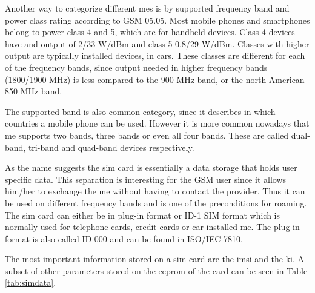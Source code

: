 Another way to categorize different \gls{me}s is by supported frequency band and power class rating according to GSM  05.05\cite{GSM0505}.
Most mobile phones and smartphones belong to power class 4 and 5, which are for handheld devices.
Class 4 devices have and output of 2/33 W/dBm and class 5 0.8/29 W/dBm.
Classes with higher output are typically installed devices, \eg in cars.
These classes are different for each of the frequency bands, since output needed in higher frequency bands (1800/1900 MHz) is less compared to the 900 MHz band, or the north American 850 MHz band.

The supported band is also common category, since it describes in which countries a mobile phone can be used.
However it is more common nowadays that \gls{me} supports two bands, three bands or even all four bands.
These are called dual-band, tri-band and quad-band devices respectively.

As the name suggests the \gls{sim} card is essentially a data storage that holds user specific data.
This separation is interesting for the GSM user since it allows him/her to exchange the \gls{me} without having to contact the provider.
Thus it can be used on different frequency bands and is one of the preconditions for roaming.
The \gls{sim} card can either be in plug-in format or ID-1 SIM format which is normally used for telephone cards, credit cards or car installed \gls{me}.
The plug-in format is also called ID-000 and can be found in ISO/IEC 7810\cite{ISO7810}.

The most important information stored on a \gls{sim} card are the \gls{imsi} and the \gls{ki}.
A subset of other parameters stored on the \gls{eeprom} of the card can be seen in Table \ref{tab:simdata}.


